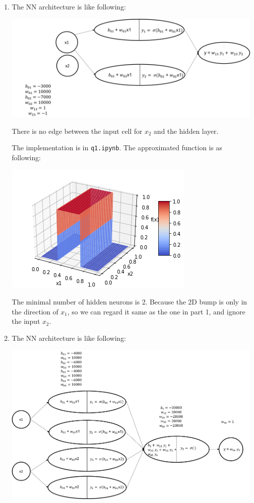 \documentclass[paper=letter, fontsize=12pt]{article}
\begin{document}
\subsection{}

\begin{enumerate}[label=(\alph*)]
	\item The NN architecture is like following:
	
	\includegraphics[scale=0.4]{q12a1.png}
	
	There is no edge between the input cell for $x_2$ and the hidden layer.
	
	The implementation is in \verb|q1.ipynb|. The approximated function is as following:
	
	\includegraphics[scale=0.6]{q12a2.png}
	
	The minimal number of hidden neurons is 2.  Because the 2D bump is only in the direction of $x_1$, so we can regard it same as the one in part 1, and ignore the input $x_2$.
	
	\item The NN architecture is like following:
	
	\includegraphics[scale=0.4]{q12b1.png}
	

\end{enumerate}
\end{document}
